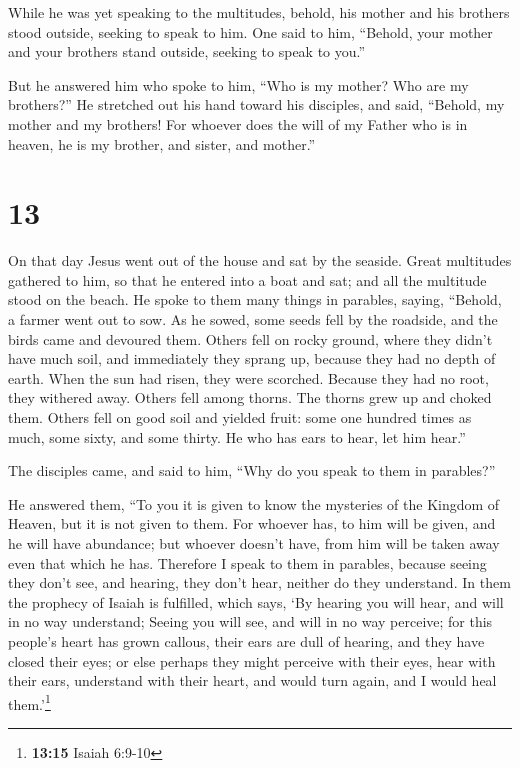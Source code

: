  While he was yet speaking to the multitudes, behold, his
mother and his brothers stood outside, seeking to speak to him.
 One said to him, ``Behold, your mother and your brothers
stand outside, seeking to speak to you.''

 But he answered him who spoke to him, ``Who is my
mother? Who are my brothers?''  He stretched out his hand
toward his disciples, and said, ``Behold, my mother and my brothers!
 For whoever does the will of my Father who is in heaven,
he is my brother, and sister, and mother.''

\hypertarget{section-12}{%
\section{13}\label{section-12}}

 On that day Jesus went out of the house and sat by the
seaside.  Great multitudes gathered to him, so that he
entered into a boat and sat; and all the multitude stood on the beach.
 He spoke to them many things in parables, saying,
``Behold, a farmer went out to sow.  As he sowed, some
seeds fell by the roadside, and the birds came and devoured them.
 Others fell on rocky ground, where they didn't have much
soil, and immediately they sprang up, because they had no depth of
earth.  When the sun had risen, they were scorched.
Because they had no root, they withered away.  Others fell
among thorns. The thorns grew up and choked them.  Others
fell on good soil and yielded fruit: some one hundred times as much,
some sixty, and some thirty.  He who has ears to hear, let
him hear.''

 The disciples came, and said to him, ``Why do you speak
to them in parables?''

 He answered them, ``To you it is given to know the
mysteries of the Kingdom of Heaven, but it is not given to them.
 For whoever has, to him will be given, and he will have
abundance; but whoever doesn't have, from him will be taken away even
that which he has.  Therefore I speak to them in
parables, because seeing they don't see, and hearing, they don't hear,
neither do they understand.  In them the prophecy of
Isaiah is fulfilled, which says, `By hearing you will hear, and will in
no way understand; Seeing you will see, and will in no way perceive;
 for this people's heart has grown callous, their ears
are dull of hearing, and they have closed their eyes; or else perhaps
they might perceive with their eyes, hear with their ears, understand
with their heart, and would turn again, and I would heal
them.'\footnote{\textbf{13:15} Isaiah 6:9-10}

